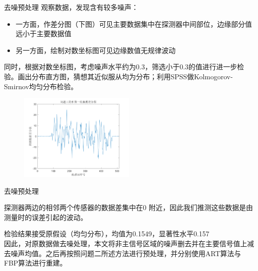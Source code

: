 \documentclass{beamer}
\begin{document}
\begin{frame}{去噪预处理}
	\small 观察数据，发现含有较多噪声：
	  
	\begin{itemize}
		  
		\item \small 一方面，作差分图（下图）可见主要数据集中在探测器中间部位，边缘部分值远小于主要数据值
		        
		\item \small 另一方面，绘制对数坐标图可见边缘数值无规律波动
		        
	\end{itemize}
	  
	同时，根据对数坐标图，考虑噪声水平约为0.3，筛选小于0.3的值进行进一步检验。画出分布直方图，猜想其近似服从均为分布；利用SPSS做Kolmogorov-Smirnov均匀分布检验。
	
	\begin{figure}[H]
		\centering
		\includegraphics[width=0.5\textwidth]{./pic/fujian5_1.png}\\
	\end{figure}
\end{frame}
  
  
  
\begin{frame}{去噪预处理}
	  

	\small 探测器两边的相邻两个传感器的数据差集中在0 附近，因此我们推测这些数据是由测量时的误差引起的波动。
	  
	\small 检验结果接受原假设（均匀分布），均值为0.1549，显著性水平0.157\\
	  
	\small 因此，对原数据做去噪处理，本文将非主信号区域的噪声删去并在主要信号值上减去噪声均值。之后再按照问题二所述方法进行预处理，并分别使用ART算法与FBP算法进行重建。
	  
\end{frame}
  
  
  
\end{document}
